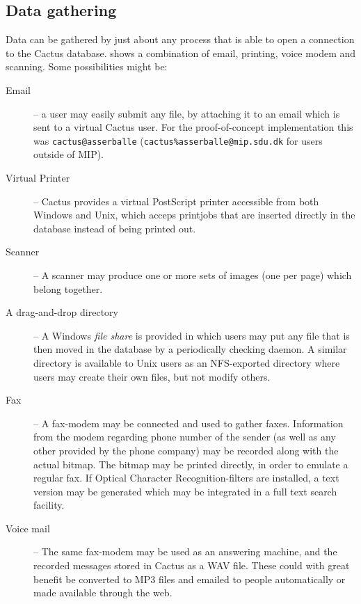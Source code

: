 \subsection{Data gathering}


Data can be gathered by just about any process that is able
to open a connection to the Cactus database.
 shows a combination of email, printing,
voice modem and scanning.  Some possibilities might be:


\begin{description}
\item[Email] -- a user may easily submit any file, by
  attaching it to an email which is sent to a virtual Cactus
  user.  For the proof-of-concept implementation this was
  \texttt{cactus@asserballe}
  (\texttt{cactus\%asserballe@mip.sdu.dk} for users outside
  of MIP).

\item[Virtual Printer] -- Cactus provides a virtual
  PostScript printer accessible from both Windows and Unix,
  which acceps printjobs that are inserted directly in the
  database instead of being printed out.

\item[Scanner] -- A scanner may produce one or more sets of
  images (one per page) which belong together.

\item[A drag-and-drop directory] -- A Windows \textit{file
    share} is provided in which users may put any file that
  is then moved in the database by a periodically checking
  daemon.  A similar directory is available to Unix users as
  an NFS-exported directory where users may create their own
  files, but not modify others.


\item[Fax] -- A fax-modem may be connected and used to
  gather faxes.  Information from the modem regarding phone
  number of the sender (as well as any other provided by the
  phone company) may be recorded along with the actual
  bitmap.  The bitmap may be printed directly, in order to
  emulate a regular fax.  If Optical Character
  Recognition-filters are installed, a text version may be
  generated which may be integrated in a full text search
  facility.

\item[Voice mail] -- The same fax-modem may be used as an answering
machine, and the recorded messages stored in Cactus as a WAV file.
These could with great benefit be converted to MP3 files and emailed
to people automatically or made available through the web.

\end{description}

